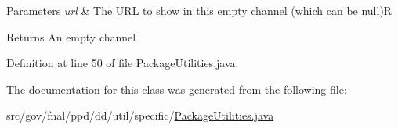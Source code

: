 \begin{DoxyParams}{Parameters}
{\em url} & The U\-R\-L to show in this empty channel (which can be null)R \\
\hline
\end{DoxyParams}
\begin{DoxyReturn}{Returns}
An empty channel 
\end{DoxyReturn}


Definition at line 50 of file Package\-Utilities.\-java.



The documentation for this class was generated from the following file\-:\begin{DoxyCompactItemize}
\item 
src/gov/fnal/ppd/dd/util/specific/\hyperlink{PackageUtilities_8java}{Package\-Utilities.\-java}\end{DoxyCompactItemize}
